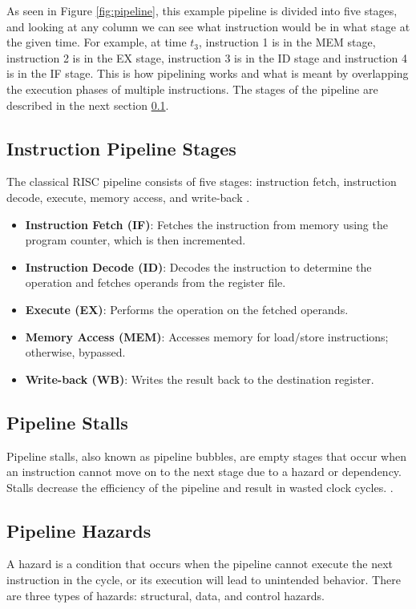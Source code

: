 As seen in Figure \ref{fig:pipeline}, this example pipeline is divided into five stages, and looking at any column we can see what instruction would be in what stage at the given time. For example, at time $t_3$, instruction 1 is in the MEM stage, instruction 2 is in the EX stage, instruction 3 is in the ID stage and instruction 4 is in the IF stage. This is how pipelining works and what is meant by overlapping the execution phases of multiple instructions. The stages of the pipeline are described in the next section \ref{sec:pipeline_stages}.


\subsection {Instruction Pipeline Stages}\label{sec:pipeline_stages}
The classical RISC pipeline consists of five stages: instruction fetch, instruction decode, execute, memory access, and write-back \cite{enwiki:1255528196}\cite{he2023survey}. 

\begin{itemize}
     \item \textbf{Instruction Fetch (IF)}: Fetches the instruction from memory using the program counter, which is then incremented.
     \item \textbf{Instruction Decode (ID)}: Decodes the instruction to determine the operation and fetches operands from the register file.
     \item \textbf{Execute (EX)}: Performs the operation on the fetched operands.
     \item \textbf{Memory Access (MEM)}: Accesses memory for load/store instructions; otherwise, bypassed.
     \item \textbf{Write-back (WB)}: Writes the result back to the destination register.
\end{itemize}


\subsection {Pipeline Stalls}\label{sec:pipeline_stalls}
Pipeline stalls, also known as pipeline bubbles, are empty stages that occur when an instruction cannot move on to the next stage due to a hazard or dependency. Stalls decrease the efficiency of the pipeline and result in wasted clock cycles. \cite{patterson1994computer}.

\subsection {Pipeline Hazards}\label{sec:pipeline_hazards}
A hazard is a condition that occurs when the pipeline cannot execute the next instruction in the cycle, or its execution will lead to unintended behavior. There are three types of hazards: structural, data, and control hazards\cite{olanrewaju2017design}.

